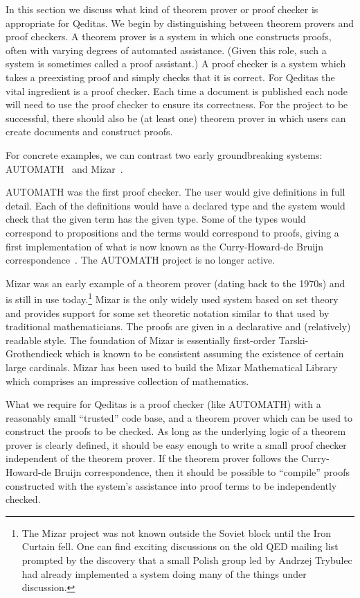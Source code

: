 \documentclass{article}
\begin{document}
In this section we discuss what kind of theorem prover or proof checker
is appropriate for Qeditas. We begin by distinguishing between theorem provers and
proof checkers. A theorem prover is a system in which one constructs proofs,
often with varying degrees of automated assistance. (Given this role, such a
system is sometimes called a proof assistant.) A proof checker is a system which
takes a preexisting proof and simply checks that it is correct. For Qeditas the
vital ingredient is a proof checker. Each time a document is published each node
will need to use the proof checker to ensure its correctness. For the project to
be successful, there should also be (at least one) theorem prover in which users
can create documents and construct proofs.

For concrete examples, we can contrast two early groundbreaking systems:
AUTOMATH~\cite{debr68,DeBruijn80} and Mizar~\cite{RudnickiTrybulec2001}.

AUTOMATH was the first proof checker. The user would give definitions in
full detail. Each of the definitions would have a declared type and the system
would check that the given term has the given type. Some of the types would
correspond to propositions and the terms would correspond to proofs, giving
a first implementation of what is now known as the Curry-Howard-de Bruijn
correspondence~\cite{debr68,DeBruijn80,howa80}. The AUTOMATH project is no longer active.

Mizar was an early example of a theorem prover (dating back to the 1970s)
and is still in use today.\footnote{The Mizar project was not known outside the Soviet block until the Iron Curtain fell. One can find exciting discussions on the old QED mailing list prompted by the discovery that a small Polish group led by Andrzej Trybulec had already implemented a system doing many of the things under discussion.}
Mizar is the only widely used system based on set theory and provides
support for some set theoretic notation similar to
that used by traditional mathematicians.
The proofs are given in a declarative and
(relatively) readable style.
The foundation of Mizar is essentially first-order Tarski-Grothendieck
which is known to be consistent assuming the existence of certain large cardinals.
Mizar has been used to build the Mizar Mathematical Library
which comprises an impressive collection of mathematics.

What we require for Qeditas is a proof checker (like AUTOMATH)
with a reasonably small ``trusted'' code base, and a theorem prover which can
be used to construct the proofs to be checked. As long as the underlying logic
of a theorem prover is clearly defined, it should be easy enough to write a
small proof checker independent of the theorem prover. If the theorem prover
follows the Curry-Howard-de Bruijn correspondence, then it should be possible
to ``compile'' proofs constructed with the system's assistance into proof terms
to be independently checked.
\end{document}
